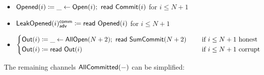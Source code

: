 \begin{itemize}
\item {\color{red} $\mathsf{Opened}(i) \coloneqq \_ \leftarrow \mathsf{Open}(i); \ \mathsf{read} \ \mathsf{Commit}(i)$ for $i \leq N+1$}
\item {\color{red} $\mathsf{LeakOpened}(i)^{\mathsf{comm}}_{\mathsf{adv}} \coloneqq \mathsf{read} \ \mathsf{Opened}(i)$ for $i \leq N+1$}
\item $\begin{cases*} \Out(i) \coloneqq \_ \leftarrow \AllOpen(N+2); \ \read{\SumCommit(N+2)} & \hspace{10pt} \text{if $i \leq N+1$ honest} \\ \Out(i) \coloneqq \read{\Out(i)} & \hspace{10pt} \text{if $i \leq N+1$ corrupt} \end{cases*}$
\end{itemize}

\noindent The remaining channels $\mathsf{AllCommitted}(-)$ can be simplified:

